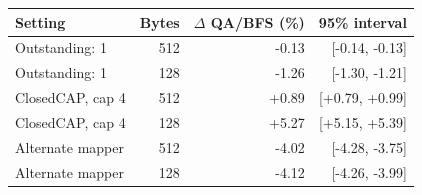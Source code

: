 \begin{tabular}{lrrr}
\toprule
Setting & Bytes & $\Delta$ QA/BFS (\%) & 95\% interval \\
\midrule
Outstanding: 1 & 512 & -0.13 & [-0.14, -0.13] \\
Outstanding: 1 & 128 & -1.26 & [-1.30, -1.21] \\
ClosedCAP, cap 4 & 512 & +0.89 & [+0.79, +0.99] \\
ClosedCAP, cap 4 & 128 & +5.27 & [+5.15, +5.39] \\
Alternate mapper & 512 & -4.02 & [-4.28, -3.75] \\
Alternate mapper & 128 & -4.12 & [-4.26, -3.99] \\
\bottomrule
\end{tabular}
